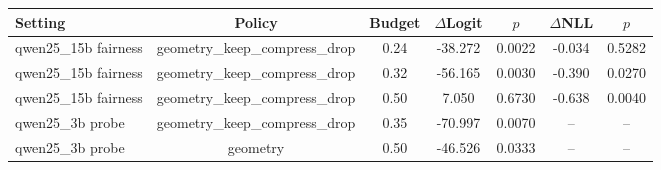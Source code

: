 \begin{tabular}{lcccccc}
\toprule
Setting & Policy & Budget & $\Delta$Logit & $p$ & $\Delta$NLL & $p$ \\
\midrule
qwen25\_15b fairness & geometry\_keep\_compress\_drop & 0.24 & -38.272 & 0.0022 & -0.034 & 0.5282 \\
qwen25\_15b fairness & geometry\_keep\_compress\_drop & 0.32 & -56.165 & 0.0030 & -0.390 & 0.0270 \\
qwen25\_15b fairness & geometry\_keep\_compress\_drop & 0.50 & 7.050 & 0.6730 & -0.638 & 0.0040 \\
qwen25\_3b probe & geometry\_keep\_compress\_drop & 0.35 & -70.997 & 0.0070 & -- & -- \\
qwen25\_3b probe & geometry & 0.50 & -46.526 & 0.0333 & -- & -- \\
\bottomrule
\end{tabular}